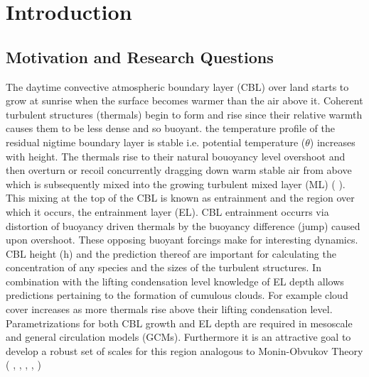 
\chapter{Introduction} 
\label{ch:Introduction}
\setlength{\parindent}{0cm}

\section{Motivation and Research Questions}
\label{sec:Mot}
The daytime convective atmospheric boundary layer (\acs{CBL}) over land starts to grow at sunrise when the surface becomes warmer than the air above it.  Coherent turbulent structures (thermals) begin to form and rise since their relative warmth causes them to be less dense and so buoyant.  the temperature profile of the residual nigtime boundary layer is stable i.e. potential temperature ($\theta$) increases with height.  The thermals rise to their natural bouoyancy level overshoot and then overturn or recoil concurrently dragging down warm stable air from above which is subsequently mixed into the growing turbulent mixed layer (\acs{ML}) (\citeauthor{Stull-BLMetIntro} \citeyear{Stull-BLMetIntro}).  This mixing at the top of the \acs{CBL} is known as entrainment and the region over which it occurs, the entrainment layer (\acs{EL}).  \acs{CBL} entrainment occurrs via distortion of buoyancy driven thermals by the buoyancy difference (jump) caused upon overshoot.  These opposing buoyant forcings make for interesting dynamics.\\

\acs{CBL} height (h) and the prediction thereof are important for calculating the concentration of any species and the sizes of the turbulent structures.  In combination with the lifting condensation level knowledge of \acs{EL} depth allows predictions pertaining to the formation of cumulous clouds.  For example cloud cover increases as more thermals rise above their lifting condensation level.  Parametrizations for both \acs{CBL} growth and \acs{EL} depth are required in mesoscale and general circulation models (\acs{GCM}s).  Furthermore it is an attractive goal to develop a robust set of scales for this region analogous to Monin-Obvukov Theory (\citeauthor{Stull-BLMetIntro} \citeyear{Stull-BLMetIntro}, \citeauthor{Traum11} \citeyear{Traum11}, \citeauthor{SteynBaldHoff} \citeyear{SteynBaldHoff}, \citeauthor{StullNelEl} \citeyear{StullNelEl}, \citeauthor{Sorbjan} \citeyear{Sorbjan})\\

